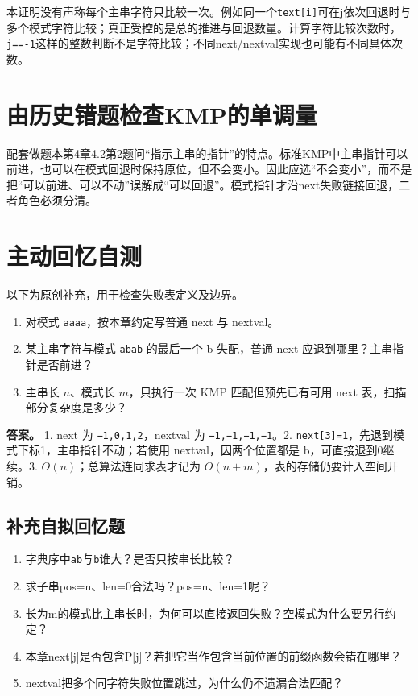 本证明没有声称每个主串字符只比较一次。例如同一个\texttt{text[i]}可在j依次回退时与多个模式字符比较；真正受控的是总的推进与回退数量。计算字符比较次数时，\texttt{j=\allowbreak{}=\allowbreak{}-1}这样的整数判断不是字符比较；不同next/nextval实现也可能有不同具体次数。

\section{由历史错题检查KMP的单调量}\label{DS04-errors}

配套做题本第4章4.2第2题问``指示主串的指针''的特点。标准KMP中主串指针可以前进，也可以在模式回退时保持原位，但不会变小。因此应选``不会变小''，而不是把``可以前进、可以不动''误解成``可以回退''。模式指针才沿next失败链接回退，二者角色必须分清。

\section{主动回忆自测}\label{DS04-check}

以下为原创补充，用于检查失败表定义及边界。

\begin{enumerate}
\def\labelenumi{\arabic{enumi}.}
\tightlist
\item
  对模式 \texttt{aaaa}，按本章约定写普通 next 与 nextval。
\item
  某主串字符与模式 \texttt{abab} 的最后一个 b 失配，普通 next 应退到哪里？主串指针是否前进？
\item
  主串长 \(n\)、模式长 \(m\)，只执行一次 KMP 匹配但预先已有可用 next 表，扫描部分复杂度是多少？
\end{enumerate}

\textbf{答案。} 1. next 为 \texttt{−1,\allowbreak{}0,\allowbreak{}1,\allowbreak{}2}，nextval 为 \texttt{−1,\allowbreak{}−1,\allowbreak{}−1,\allowbreak{}−1}。2. \texttt{next[3]=\allowbreak{}1}，先退到模式下标1，主串指针不动；若使用 nextval，因两个位置都是 b，可直接退到0继续。3. \(O(n)\)；总算法连同求表才记为 \(O(n+m)\)，表的存储仍要计入空间开销。

\subsection{补充自拟回忆题}\label{DS04-recall-extra}

\begin{recallcard}

\begin{enumerate}
\def\labelenumi{\arabic{enumi}.}
\setcounter{enumi}{3}
\tightlist
\item
  字典序中\texttt{ab}与\texttt{b}谁大？是否只按串长比较？
\item
  求子串pos=n、len=0合法吗？pos=n、len=1呢？
\item
  长为m的模式比主串长时，为何可以直接返回失败？空模式为什么要另行约定？
\item
  本章next{[}j{]}是否包含P{[}j{]}？若把它当作包含当前位置的前缀函数会错在哪里？
\item
  nextval把多个同字符失败位置跳过，为什么仍不遗漏合法匹配？
\end{enumerate}

\end{recallcard}

